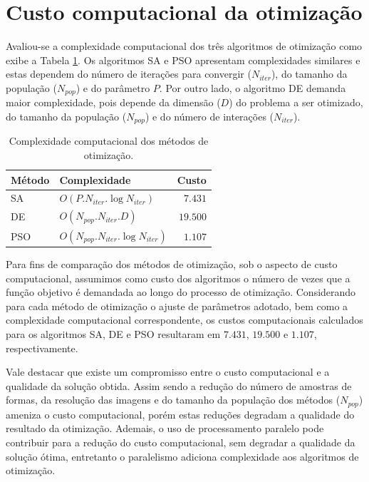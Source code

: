 \section{Custo computacional da otimização \label{sec:comp_cost}}


 Avaliou-se a complexidade computacional dos três algoritmos de otimização como exibe a Tabela \ref{tbl:complexity}.  Os algoritmos \ac{SA} e \ac{PSO} apresentam complexidades similares e estas dependem do número de iterações para convergir ($N_{iter}$), do tamanho da população  ($N_{pop}$) e do parâmetro $P$.  Por outro lado, o algoritmo \ac{DE} demanda maior complexidade, pois depende da dimensão ($D$) do problema a ser otimizado, do tamanho da população ($N_{pop}$) e do número de interações ($N_{iter}$).

\begin{table}[h!]
\centering
\caption{Complexidade computacional dos métodos de otimização.}
\label{tbl:complexity}
  \begin{tabular}{llr}
  \toprule[1.5pt]
 Método & Complexidade& Custo\\
 \midrule
   \ac{SA}  & $O(P.N_{iter}.\log{N_{iter}})$ & $7.431$    \\
   \ac{DE}  & $O(N_{pop}.N_{iter}.D)$ & $19.500$  \\
   \ac{PSO}&  $O(N_{pop}.N_{iter}.\log{N_{iter}})$ & $1.107$\\
  \bottomrule[1.5pt]
  \end{tabular}
\end{table}

Para fins de comparação dos métodos de otimização, sob o aspecto de custo computacional, assumimos como custo dos algoritmos o número de vezes que a função objetivo é demandada ao longo do processo de otimização. Considerando para cada método de otimização o ajuste de parâmetros adotado, bem como a complexidade computacional correspondente, os custos computacionais calculados para os algoritmos \ac{SA}, \ac{DE} e \ac{PSO} resultaram em $7.431$, $19.500$ e $1.107$, respectivamente. 

Vale destacar que existe um compromisso entre o custo computacional e a qualidade da solução obtida. Assim sendo a redução do número de amostras de formas, da resolução das imagens e do tamanho da população dos métodos ($N_{pop}$) ameniza o custo computacional, porém estas reduções degradam a qualidade do resultado da otimização. Ademais, o uso de processamento paralelo pode contribuir para a redução do custo computacional, sem degradar a qualidade da solução ótima, entretanto o paralelismo adiciona complexidade aos algoritmos de otimização. 



